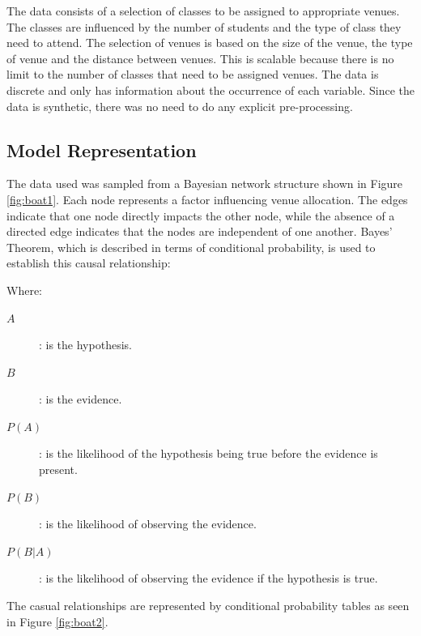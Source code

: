 \documentclass[conference]{IEEEtran}
\begin{document}
The data consists of a selection of classes to be assigned to appropriate venues. The classes are influenced by the number of students and the type of class they need to attend. The selection of venues is based on the size of the venue, the type of venue and the distance between venues. This is scalable because there is no limit to the number of classes that need to be assigned venues. The data is discrete and only has information about the occurrence of each variable. Since the data is synthetic, there was no need to do any explicit pre-processing.

\subsection{Model Representation}
The data used was sampled from a Bayesian network structure shown in Figure \ref{fig:boat1}. Each node represents a factor influencing venue allocation. The edges indicate that one node directly impacts the other node, while the absence of a directed edge indicates that the nodes are independent of one another. Bayes' Theorem, which is described in terms of conditional probability, is used to establish this causal relationship:

Where:
\begin{description}
    \item [$A$]: is the hypothesis.
    \item [$B$]: is the evidence.
    \item [$P(A)$]: is the likelihood of the hypothesis being true before the evidence is present.
    \item [$P(B)$]: is the likelihood of observing the evidence.
    \item [$P(B\vert A)$]: is the likelihood of observing the evidence if the  hypothesis is true.
\end{description}

The casual relationships are represented by conditional probability tables as seen in Figure \ref{fig:boat2}. 
\end{document}
